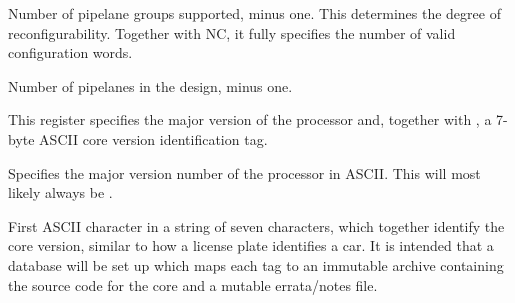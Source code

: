\reset{****}
Number of pipelane groups supported, minus one. This determines the degree of
reconfigurability. Together with NC, it fully specifies the number of valid
configuration words.

\implementation{}

\reset{****}
Number of pipelanes in the design, minus one.

\implementation{}


This register specifies the major version of the processor and, together with
, a 7-byte ASCII core version identification tag.

Specifies the major version number of the \rvex{} processor in ASCII. This will
most likely always be .

\implementation{}

First ASCII character in a string of seven characters, which together identify 
the core version, similar to how a license plate identifies a car. It is 
intended that a database will be set up which maps each tag to an immutable 
archive containing the source code for the core and a mutable errata/notes file.

\implementation{}

